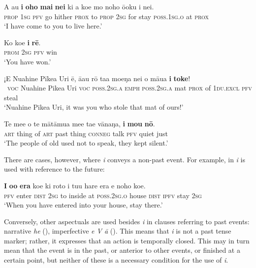 \ea\label{ex:7.14}
\gll A au \textbf{i} \textbf{oho} \textbf{mai} \textbf{nei} ki a koe mo noho ō{\ꞌ}oku {\ꞌ}i nei. \\
\textsc{prop} \textsc{1sg} \textsc{pfv} go hither \textsc{prox} to \textsc{prop} \textsc{2sg} for stay \textsc{poss.1sg.o} at \textsc{prox} \\

\glt 
‘I have come to you to live here.’ \textstyleExampleref{[R245.072]} 
\z

\ea\label{ex:7.15}
\gll Ko koe \textbf{i} \textbf{rē}. \\
\textsc{prom} \textsc{2sg} \textsc{pfv} win \\

\glt 
‘You have won.’ \textstyleExampleref{[R210.071]} 
\z

\ea\label{ex:7.16}
\gll ¡E Nuahine Pīkea {\ꞌ}Uri ē, {\ꞌ}ā{\ꞌ}au rō ta{\ꞌ}a moeŋa nei o māua \textbf{i} \textbf{toke}! \\
~\textsc{voc} Nuahine Pikea Uri \textsc{voc} \textsc{poss.2sg.a} \textsc{emph} \textsc{poss.2sg.a} mat \textsc{prox} of \textsc{1du.excl} \textsc{pfv} steal \\

\glt 
‘Nuahine Pikea Uri, it was you who stole that mat of ours!’ \textstyleExampleref{[R310.428]} 
\z

\ea\label{ex:7.17}
\gll Te me{\ꞌ}e o te mātāmu{\ꞌ}a me{\ꞌ}e ta{\ꞌ}e vānaŋa, \textbf{i} \textbf{mou} \textbf{nō}. \\
\textsc{art} thing of \textsc{art} past thing \textsc{conneg} talk \textsc{pfv} quiet just \\

\glt
‘The people of old used not to speak, they kept silent.’ \textstyleExampleref{[R310.216]} 
\z

There are cases, however, where \textit{i} conveys a non-past event. For example, in  \textit{i} is used with reference to the future:

\ea\label{ex:7.18}
\gll \textbf{I} \textbf{o{\ꞌ}o} \textbf{era} koe ki roto i tu{\ꞌ}u hare era e noho koe. \\
\textsc{pfv} enter \textsc{dist} \textsc{2sg} to inside at \textsc{poss.2sg.o} house \textsc{dist} \textsc{ipfv} stay \textsc{2sg} \\

\glt
‘When you have entered into your house, stay there.’ \textstyleExampleref{[R310.297]} 
\z

Conversely, other aspectuals are used besides \textit{i} in clauses referring to past events: narrative \textit{he} (), imperfective \textit{e V {\ꞌ}ā} (). This means that \textit{i} is not a past tense marker; rather, it expresses that an action is temporally closed. This may in turn mean that the event is in the past, or anterior to other events, or finished at a certain point, but neither of these is a necessary condition for the use of \textit{i}.


